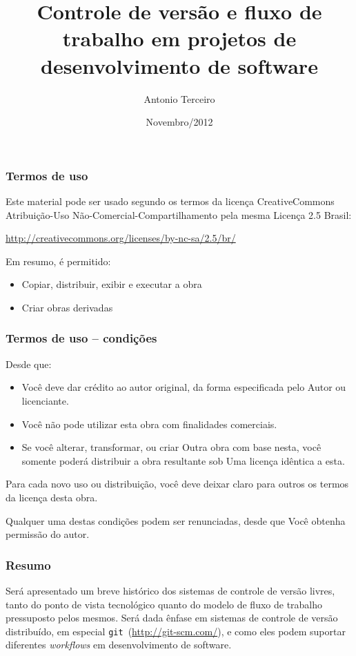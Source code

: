 \documentclass{beamer}
\title[CV e fluxo de trabalho em projetos de software]{Controle de versão e fluxo de trabalho em projetos de
desenvolvimento de software}
\author{Antonio Terceiro}
\date{Novembro/2012}
\newcommand{\git}{\texttt{git}}
\begin{document}
\begin{frame}[plain]
  \titlepage
\end{frame}

\begin{frame}
  \frametitle{Termos de uso}
  Este material pode ser usado segundo os termos da licença CreativeCommons
  Atribuição-Uso Não-Comercial-Compartilhamento pela mesma Licença 2.5 Brasil:

  \url{http://creativecommons.org/licenses/by-nc-sa/2.5/br/}

  Em resumo, é permitido:
  \begin{itemize}
    \item Copiar, distribuir, exibir e executar a obra
    \item Criar obras derivadas
  \end{itemize}
\end{frame}
\begin{frame}
  \frametitle{Termos de uso -- condições}
  Desde que:
  \begin{itemize}
    \item {} Você deve dar crédito ao autor
      original, da forma especificada pelo Autor ou licenciante.
    \item {} Você não pode utilizar esta
      obra com finalidades comerciais.
    \item {} Se você
      alterar, transformar, ou criar Outra obra com base nesta, você
      somente poderá distribuir a obra resultante sob Uma licença
      idêntica a esta.
  \end{itemize}

  Para cada novo uso ou distribuição, você deve deixar claro para outros os
  termos da licença desta obra.

  Qualquer uma destas condições podem ser renunciadas, desde que Você obtenha
  permissão do autor.
\end{frame}

\begin{frame}
  \frametitle{Resumo}

  Será apresentado um breve histórico dos sistemas de controle de
  versão livres, tanto do ponto de vista tecnológico quanto do modelo
  de fluxo de trabalho pressuposto pelos mesmos. Será dada ênfase em
  sistemas de controle de versão distribuído, em especial \git\
  (\url{http://git-scm.com/}), e como eles podem suportar diferentes
  \emph{workflows} em desenvolvimento de software.
\end{frame}
\end{document}
